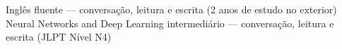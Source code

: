 \begin{cvskills}
  \cvskill
    {Inglês}
    {fluente — conversação, leitura e escrita (2 anos de estudo no exterior)}
  \cvskill
    {Neural Networks and Deep Learning}
    {intermediário — conversação, leitura e escrita (JLPT Nível N4)}
\end{cvskills}
